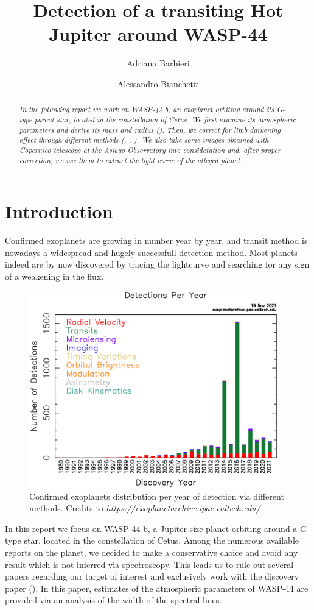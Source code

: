 \documentclass[a4paper,11pt,twocolumn]{article}
\title{Detection of a transiting Hot Jupiter around WASP-44}
\author{Adriana Barbieri \and Alessandro Bianchetti}
\begin{document}
\maketitle
\begin{abstract}

\emph{In the following report we work on WASP-44 b, an exoplanet orbiting 
around its G-type parent star, located in the constellation of Cetus. 
We first examine its atmospheric parameters and derive its mass and 
radius (\cite{Morton}). Then, we correct for limb darkening effect through different methods 
(\cite{claret2011}, \cite{claret2017}, \cite{claret2018}). We also take 
some images obtained with Copernico telescope at the Asiago Observatory into consideration 
and, after proper correction, we use them to extract the light curve of 
the alleged planet.}

\end{abstract}
\section{Introduction}

Confirmed exoplanets are growing in number year by year, and transit method 
is nowadays a widespread and hugely successfull detection method. Most planets indeed are by now discovered 
by tracing the lightcurve and searching for any sign of a weakening in the 
flux.
\begin{figure}[H]
    \centering  
    \includegraphics[scale=0.15, angle=0]{../pictures/exo_dischist.png}
    \caption{Confirmed exoplanets distribution per year of detection via different methods. Credits to \textit{https://exoplanetarchive.ipac.caltech.edu/}}
\end{figure}
In this report we focus on WASP-44 b, a Jupiter-size planet orbiting around 
a G-type star, located in the constellation of Cetus.
Among the numerous available reports on the planet, we decided to make a 
conservative choice and avoid any result which is not inferred via 
spectroscopy. This leads us to rule out several papers regarding our target of interest and exclusively
 work with the discovery paper (\cite{Anderson}). In this paper, estimates 
of the atmospheric parameters of WASP-44 are provided via an analysis of 
the width of the spectral lines.
\end{document}
